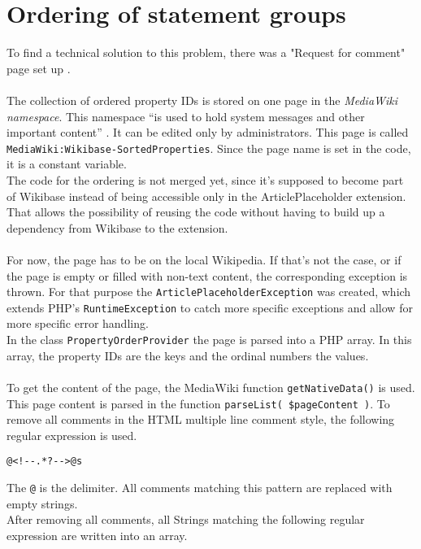 \section{Ordering of statement groups}\label{ordering-stat}

To find a technical solution to this problem, there was a "Request for comment" page set up \citep{wiki:24}. \\
\\
The collection of ordered property IDs is stored on one page in the \textit{MediaWiki namespace}. This namespace ``is used to hold system messages and other important content'' \citep{wiki:17}. It can be edited only by administrators. This page is called \texttt{\justify MediaWiki:Wikibase-SortedProperties}. Since the page name is set in the code, it is a constant variable. \\
The code for the ordering is not merged yet, since it's supposed to become part of Wikibase instead of being accessible only in the ArticlePlaceholder extension. That allows the possibility of reusing the code without having to build up a dependency from Wikibase to the  extension. \\
\\
For now, the page has to be on the local Wikipedia. If that's not the case, or if the page is empty or filled with non-text content, the corresponding exception is thrown. For that purpose the \texttt{\justify ArticlePlaceholderException} was created, which extends PHP's \texttt{\justify RuntimeException} to catch more specific exceptions and allow for more specific error handling. \\
In the class \texttt{\justify PropertyOrderProvider} the page is parsed into a PHP array. In this array, the property IDs are the keys and the ordinal numbers the values. \\
\\
To get the content of the page, the MediaWiki function \texttt{\justify getNativeData()} is used. This page content is parsed in the function \texttt{\justify parseList( \$pageContent )}. To remove all comments in the HTML multiple line comment style, the following regular expression is used.
\begin{lstlisting}[frame=single]
@<!--.*?-->@s
\end{lstlisting}
The \texttt{\justify @} is the delimiter. All comments matching this pattern are replaced with empty strings. \\
After removing all comments, all Strings matching the following regular expression are written into an array.
